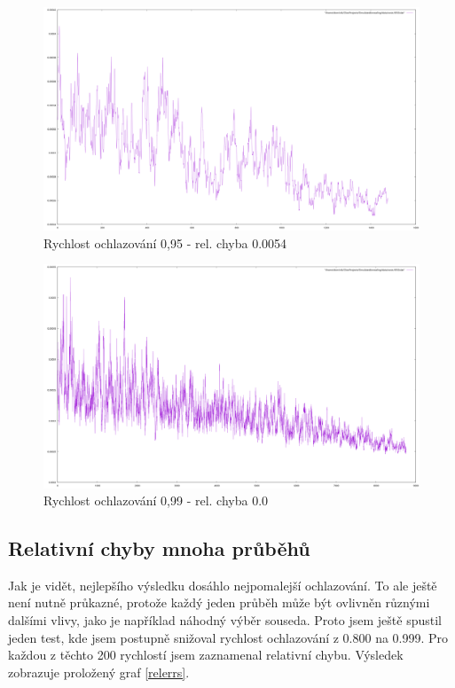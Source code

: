 \documentclass[12pt,a4paper]{article}
\begin{document}
\begin{figure}[H]
\includegraphics[width=\textwidth]{topCalcBottomCalc95}
\caption{Rychlost ochlazování 0,95 - rel. chyba 0.0054}
\label{topCalcBottomCalc95}
\end{figure}

\begin{figure}[H]
\includegraphics[width=\textwidth]{topCalcBottomCalc99}
\caption{Rychlost ochlazování 0,99 - rel. chyba 0.0}
\label{topCalcBottomCalc99}
\end{figure}


\subsection{Relativní chyby mnoha průběhů}
\label{sec_relerrs}

Jak je vidět, nejlepšího výsledku dosáhlo nejpomalejší ochlazování. To ale ještě není nutně průkazné, protože každý jeden průběh může být ovlivněn různými dalšími vlivy, jako je například náhodný výběr souseda. Proto jsem ještě spustil jeden test, kde jsem postupně snižoval rychlost ochlazování z 0.800 na 0.999. Pro každou z těchto 200 rychlostí jsem zaznamenal relativní chybu. Výsledek zobrazuje proložený graf \ref{relerrs}.
\end{document}
